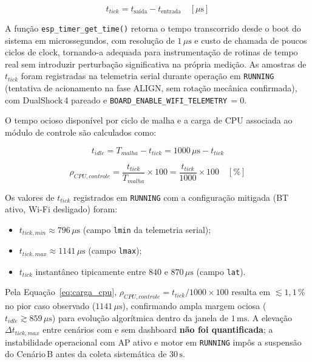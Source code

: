 \begin{equation}
    t_{tick} = t_{\text{saída}} - t_{\text{entrada}} \quad [\mu\text{s}]
    \label{eq:ttick}
\end{equation}

A função \texttt{esp\_timer\_get\_time()} retorna o tempo transcorrido desde o boot do sistema em microssegundos, com resolução de $1\,\mu\text{s}$ e custo de chamada de poucos ciclos de clock, tornando-a adequada para instrumentação de rotinas de tempo real sem introduzir perturbação significativa na própria medição. As amostras de $t_{tick}$ foram registradas na telemetria serial durante operação em \texttt{RUNNING} (tentativa de acionamento na fase ALIGN, sem rotação mecânica confirmada), com DualShock\,4 pareado e \texttt{BOARD\_ENABLE\_WIFI\_TELEMETRY}\,$= 0$.

O tempo ocioso disponível por ciclo de malha e a carga de CPU associada ao módulo de controle são calculados como:

\begin{equation}
    t_{idle} = T_{malha} - t_{tick} = 1000\,\mu\text{s} - t_{tick}
    \label{eq:tidle}
\end{equation}

\begin{equation}
    \rho_{CPU,controle} = \frac{t_{tick}}{T_{malha}} \times 100 = \frac{t_{tick}}{1000} \times 100 \quad [\%]
    \label{eq:carga_cpu}
\end{equation}

Os valores de $t_{tick}$ registrados em \texttt{RUNNING} com a configuração mitigada (BT ativo, Wi-Fi desligado) foram:

\begin{itemize}
    \item $t_{tick,min} \approx 796\,\mu\text{s}$ (campo \texttt{lmin} da telemetria serial);
    \item $t_{tick,max} \approx 1141\,\mu\text{s}$ (campo \texttt{lmax});
    \item $t_{tick}$ instantâneo tipicamente entre $840$ e $870\,\mu\text{s}$ (campo \texttt{lat}).
\end{itemize}

\noindent Pela Equação~\ref{eq:carga_cpu}, $\rho_{CPU,controle} = t_{tick}/1000 \times 100$ resulta em $\lesssim 1{,}1\,\%$ no pior caso observado ($1141\,\mu\text{s}$), confirmando ampla margem ociosa ($t_{idle} \gtrsim 859\,\mu\text{s}$) para evolução algorítmica dentro da janela de $1\,\text{ms}$. A elevação $\Delta t_{tick,max}$ entre cenários com e sem dashboard \textbf{não foi quantificada}; a instabilidade operacional com AP ativo e motor em \texttt{RUNNING} impôs a suspensão do Cenário\,B antes da coleta sistemática de $30\,\text{s}$.

